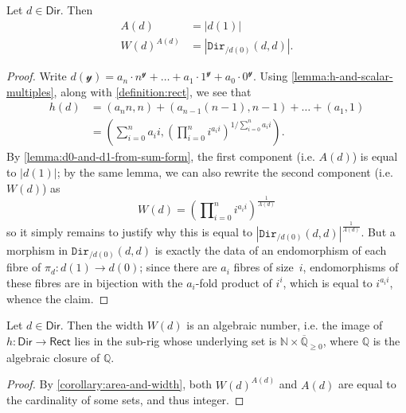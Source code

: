 \documentclass[11pt,fleqn]{article}
\renewcommand{\geq}{\geqslant}
\newcommand{\yon}{\mathcal{y}}
\newcommand{\cat}[1]{\mathtt{#1}}
\newcommand{\rig}[1]{\mathsf{#1}}
\newcommand{\Dir}{\rig{Dir}}
\newcommand{\cDir}{\cat{Dir}}
\newcommand{\Rect}{\rig{Rect}}
\begin{document}
\begin{corollary}
\label{corollary:area-and-width}
  Let $d\in\Dir$.
  Then
  \[
    \begin{aligned}
      A(d) &= |d(1)|
    \\W(d)^{A(d)} &= \left\vert\cDir_{/d(0)}(d,d)\right\vert.
    \end{aligned}
  \]
\end{corollary}

\begin{proof}
  Write $d(\yon)=a_n\cdot n^\yon+\ldots+a_1\cdot1^\yon+a_0\cdot0^\yon$.
  Using \cref{lemma:h-and-scalar-multiples}, along with \cref{definition:rect}, we see that
  \[
    \begin{aligned}
      h(d)
      &= (a_n n,n) + (a_{n-1}(n-1),n-1) + \ldots + (a_1,1)
    \\&= \left(
        \sum\nolimits_{i=0}^n a_i i,
        \left(\prod\nolimits_{i=0}^n i^{a_i i}\right)^{1/\sum_{i=0}^n a_i i}
      \right).
    \end{aligned}
  \]
  By \cref{lemma:d0-and-d1-from-sum-form}, the first component (i.e. $A(d)$) is equal to $|d(1)|$;
  by the same lemma, we can also rewrite the second component (i.e. $W(d)$) as
  \[
    W(d)
    = \left(\prod\nolimits_{i=0}^n i^{a_i i}\right)^{\frac{1}{A(d)}}
  \]
  so it simply remains to justify why this is equal to $\left\vert\cDir_{/d(0)}(d,d)\right\vert^{\frac{1}{A(d)}}$.
  But a morphism in $\cDir_{/d(0)}(d,d)$ is exactly the data of an endomorphism of each fibre of $\pi_d\colon d(1)\to d(0)$;
  since there are $a_i$ fibres of size~$i$, endomorphisms of these fibres are in bijection with the $a_i$-fold product of $i^i$, which is equal to $i^{a_i i}$, whence the claim.
\end{proof}

\begin{corollary}
\label{corollary:width-is-algebraic}
  Let $d\in\Dir$.
  Then the width $W(d)$ is an algebraic number, i.e. the image of $h\colon\Dir\to\Rect$ lies in the sub-rig whose underlying set is $\mathbb{N}\times\overline{\mathbb{Q}}_{\geq0}$, where $\mathbb{Q}$ is the algebraic closure of $\mathbb{Q}$.
\end{corollary}

\begin{proof}
  By \cref{corollary:area-and-width}, both $W(d)^{A(d)}$ and $A(d)$ are equal to the cardinality of some sets, and thus integer.
\end{proof}
\end{document}
